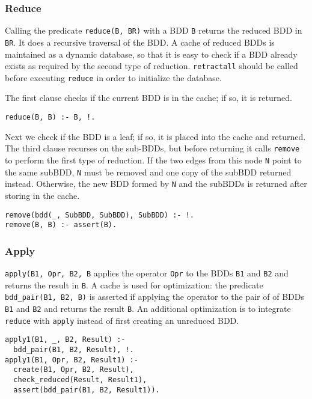 \documentclass[11pt]{article}
\newcommand*{\p}[1]{\textup{\texttt{#1}}}
\begin{document}
\subsubsection{Reduce}

Calling the predicate \p{reduce(B, BR)} with a BDD \p{B} returns the
reduced BDD in \p{BR}. It does a recursive traversal of the BDD. A cache
of reduced BDDs is maintained as a dynamic database, so that it is easy
to check if a BDD already exists as required by the second type of
reduction. \p{retractall} should be called before executing \p{reduce}
in order to initialize the database.

The first clause checks if the current BDD is in the cache; if so,
it is returned.

\begin{verbatim}
reduce(B, B) :- B, !.
\end{verbatim}

Next we check if the BDD is a leaf; if so, it is placed into the cache
and returned. The third clause recurses on the sub-BDDs, but before
returning it calls \p{remove} to perform the first type of reduction. If
the two edges from this node \p{N} point to the same subBDD, \p{N} must
be removed and one copy of the subBDD returned instead. Otherwise, the
new BDD formed by \p{N} and the subBDDs is returned after storing in the
cache.

\begin{verbatim}
remove(bdd(_, SubBDD, SubBDD), SubBDD) :- !.
remove(B, B) :- assert(B).
\end{verbatim}

\subsubsection{Apply}

\p{apply(B1, Opr, B2, B} applies the operator \p{Opr} to
the BDDs \p{B1} and \p{B2} and returns the result in \p{B}. A cache is
used for optimization: the predicate \p{bdd\_pair(B1, B2, B)} is
asserted if applying the operator to the pair of of BDDs \p{B1} and
\p{B2} and returns the result \p{B}. An additional optimization is to
integrate \p{reduce} with \p{apply} instead of first creating an
unreduced BDD.

\begin{verbatim}
apply1(B1, _, B2, Result) :-
  bdd_pair(B1, B2, Result), !.
apply1(B1, Opr, B2, Result1) :-
  create(B1, Opr, B2, Result),
  check_reduced(Result, Result1),
  assert(bdd_pair(B1, B2, Result1)).
\end{verbatim}
\end{document}
